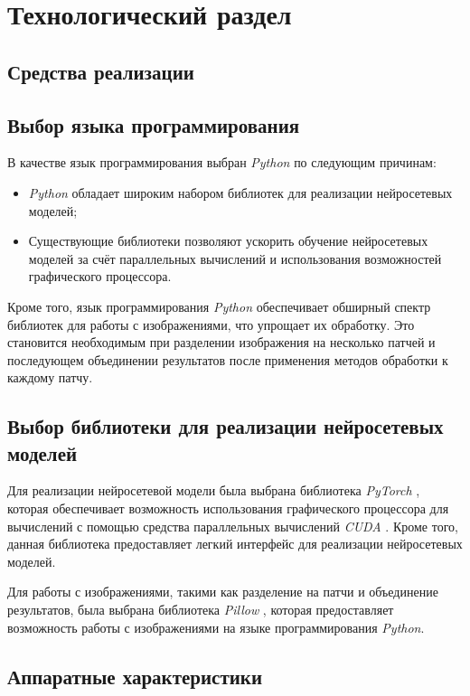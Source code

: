 \chapter{Технологический раздел}
\section{Средства реализации}
\section*{Выбор языка программирования}

В качестве язык программирования выбран \textit{Python} \cite{python} по следующим причинам:

\begin{itemize}
    \item \textit{Python} обладает широким набором библиотек для реализации нейросетевых моделей;
    \item Существующие библиотеки позволяют ускорить обучение нейросетевых моделей за счёт параллельных вычислений и использования возможностей графического процессора.
\end{itemize}

Кроме того, язык программирования \textit{Python} обеспечивает обширный спектр библиотек для работы с изображениями, что упрощает их обработку. Это становится необходимым при разделении изображения на несколько патчей и последующем объединении результатов после применения методов обработки к каждому патчу.

\section*{Выбор библиотеки для реализации нейросетевых моделей}

Для реализации нейросетевой модели была выбрана библиотека \textit{PyTorch} \cite{paszke2019pytorch}, которая обеспечивает возможность использования графического процессора для вычислений с помощью средства параллельных вычислений \textit{CUDA} \cite{nvidia2011cuda}. Кроме того, данная библиотека предоставляет легкий интерфейс для реализации нейросетевых моделей.

Для работы с изображениями, такими как разделение на патчи и объединение результатов, была выбрана библиотека \textit{Pillow} \cite{clark2002python}, которая предоставляет возможность работы с изображениями на языке программирования \textit{Python}.

\section*{Аппаратные характеристики}


